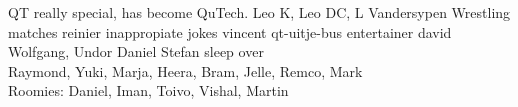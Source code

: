 QT really special, has become QuTech. Leo K, Leo DC, L Vandersypen
Wrestling matches reinier
inappropiate jokes vincent
qt-uitje-bus entertainer david
Wolfgang, Undor Daniel Stefan sleep over \\
\newpage
Raymond, Yuki, Marja, Heera, Bram, Jelle, Remco, Mark \\
Roomies: Daniel, Iman, Toivo, Vishal, Martin \\



%